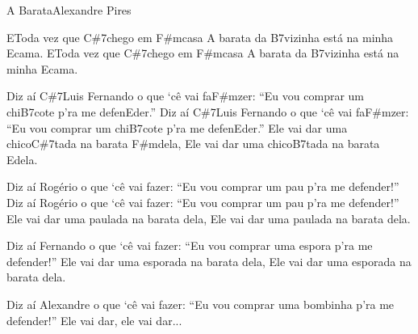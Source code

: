 \begin{musica}{A Barata}{Alexandre Pires}{}

\ac{E}{To}da vez que \ac{C#7}{che}go em \ac{F#m}{ca}sa
A barata da \ac{B7}{vi}zinha está na minha \ac{E}{ca}ma.
\ac{E}{To}da vez que \ac{C#7}{che}go em \ac{F#m}{ca}sa
A barata da \ac{B7}{vi}zinha está na minha \ac{E}{ca}ma.

Diz aí \ac{C#7}{Luis} Fernando o que ‘cê vai fa\ac{F#m}{zer}:
“Eu vou comprar um chi\ac{B7}{co}te p’ra me defen\ac{E}{der}.”
Diz aí \ac{C#7}{Luis} Fernando o que ‘cê vai fa\ac{F#m}{zer}:
“Eu vou comprar um chi\ac{B7}{co}te p’ra me defen\ac{E}{der}.”
Ele vai dar uma chico\ac{C#7}{ta}da na barata \ac{F#m}{de}la,
Ele vai dar uma chico\ac{B7}{ta}da na barata \ac{E}{de}la.


Diz aí Rogério o que ‘cê vai fazer:
“Eu vou comprar um pau p’ra me defender!”
Diz aí Rogério o que ‘cê vai fazer:
“Eu vou comprar um pau p’ra me defender!”
Ele vai dar uma paulada na barata dela,
Ele vai dar uma paulada na barata dela.


Diz aí Fernando o que ‘cê vai fazer:
“Eu vou comprar uma espora p’ra me defender!”
Ele vai dar uma esporada na barata dela,
Ele vai dar uma esporada na barata dela.


Diz aí Alexandre o que ‘cê vai fazer:
“Eu vou comprar uma bombinha p’ra me defender!”
Ele vai dar, ele vai dar...

\end{musica}

